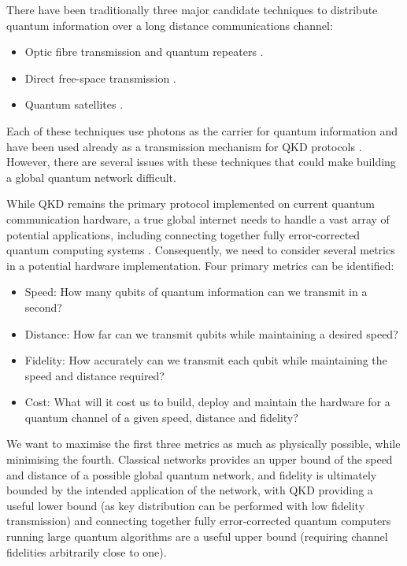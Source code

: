 \documentclass[twocolumn, aps, rmp, amsmath, amssymb, nofootinbib, superscriptaddress, longbibliography, floatfix, table-of-contents, eqsecnum]{revtex4-2}
\begin{document}
There have been traditionally three major candidate techniques to distribute quantum information over a long distance communications channel:
\begin{itemize}
\item Optic fibre transmission and quantum repeaters \cite{?}.
\item Direct free-space transmission \cite{?}.
\item Quantum satellites \cite{?}. 
\end{itemize}

Each of these techniques use photons as the carrier for quantum information and have been used already as a transmission mechanism for QKD protocols \cite{?}. However, there are several issues with these techniques that could make building a global quantum network difficult. 

While QKD remains the primary protocol implemented on current quantum communication hardware, a true global internet needs to handle a vast array of potential applications, including connecting together fully error-corrected quantum computing systems \cite{?}. Consequently, we need to consider several metrics in a potential hardware implementation. Four primary metrics can be identified:
\begin{itemize}
\item Speed: How many qubits of quantum information can we transmit in a second?
\item Distance: How far can we transmit qubits while maintaining a desired speed?
\item Fidelity: How accurately can we transmit each qubit while maintaining the speed and distance required?
\item Cost: What will it cost us to build, deploy and maintain the hardware for a quantum channel of a given speed, distance and fidelity?
\end{itemize}

We want to maximise the first three metrics as much as physically possible, while minimising the fourth. Classical networks provides an upper bound of the speed and distance of a possible global quantum network, and fidelity is ultimately bounded by the intended application of the network, with QKD providing a useful lower bound (as key distribution can be performed with low fidelity transmission) and connecting together fully error-corrected quantum computers running large quantum algorithms are a useful upper bound (requiring channel fidelities arbitrarily close to one). 
\end{document}
